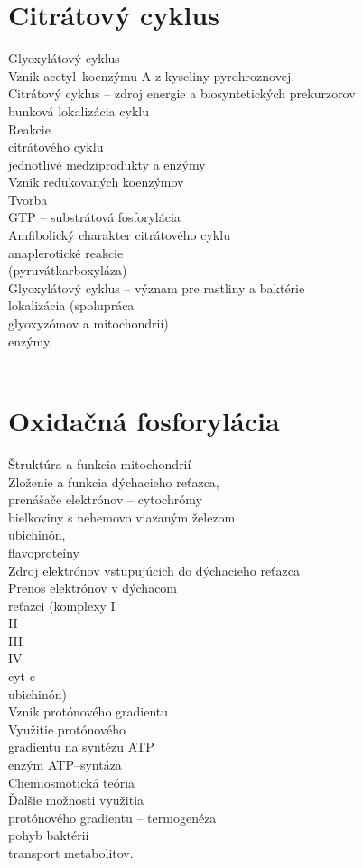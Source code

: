 \section{Citrátový cyklus}
Glyoxylátový cyklus\\
Vznik acetyl--koenzýmu A z kyseliny pyrohroznovej.\\
Citrátový cyklus -- zdroj energie a biosyntetických prekurzorov\\
\tab bunková lokalizácia cyklu\\
Reakcie\\
citrátového cyklu\\
\tab jednotlivé medziprodukty a enzýmy\\
Vznik redukovaných koenzýmov\\
Tvorba\\
GTP -- substrátová fosforylácia\\
Amfibolický charakter citrátového cyklu\\
\tab anaplerotické reakcie\\
(pyruvátkarboxyláza)\\
Glyoxylátový cyklus -- význam pre rastliny a baktérie\\
\tab lokalizácia (spolupráca\\
glyoxyzómov a mitochondrií)\\
\tab enzýmy.\\
\\
\section{Oxidačná fosforylácia}
Štruktúra a funkcia mitochondrií\\
Zloženie a funkcia dýchacieho reťazca,\\
prenášače elektrónov -- cytochrómy\\
\tab bielkoviny s nehemovo viazaným železom\\
\tab ubichinón,\\
flavoproteíny\\
Zdroj elektrónov vstupujúcich do dýchacieho reťazca\\
Prenos elektrónov v dýchacom\\
reťazci (komplexy I\\
\tab II\\
\tab III\\
\tab IV\\
\tab cyt c\\
\tab ubichinón)\\
Vznik protónového gradientu\\
Využitie protónového\\
gradientu na syntézu ATP\\
\tab enzým ATP--syntáza\\
Chemiosmotická teória\\
Ďalšie možnosti využitia\\
protónového gradientu -- termogenéza\\
\tab pohyb baktérií\\
\tab transport metabolitov.\\
\\
